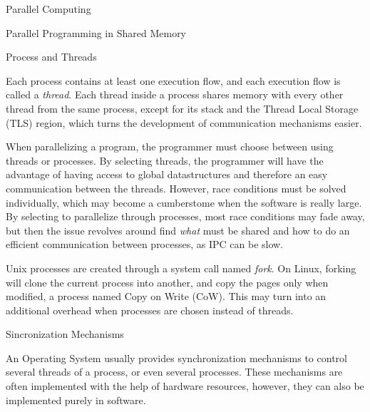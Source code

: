 \begin{section}{Parallel Computing}
\begin{subsection}{Parallel Programming in Shared Memory}
\begin{subsubsection}{Process and Threads}

Each process contains at least one execution flow, and each execution
flow is called a \textit{thread}. Each thread inside a process
shares memory with every other thread from the same process, except
for its stack and the Thread Local Storage (TLS) region, which turns
the development of communication mechanisms easier.

When parallelizing a program, the programmer must choose between
using threads or processes. By selecting threads, the programmer
will have the advantage of having access to global datastructures
and therefore an easy communication between the threads. However,
race conditions must be solved individually, which may become a
cumberstome when the software is really large. By selecting
to parallelize through processes, most race conditions may fade away,
but then the issue revolves around find \textit{what} must be shared and
how to do an efficient communication between processes, as IPC can be slow.

Unix processes are created through a system call named \textit{fork}. On
Linux, forking will clone the current process into another, and copy
the pages only when modified, a process named Copy on Write (CoW). This
may turn into an additional overhead when processes are chosen instead
of threads.


\end{subsubsection}

\begin{subsubsection}{Sincronization Mechanisms}

	An Operating System usually provides synchronization mechanisms
	to control several threads of a process, or even several processes.
	These mechanisms are often implemented with the help of hardware
	resources, however, they can also be implemented purely in software.



\end{subsubsection}
\end{subsection}
\end{section}
